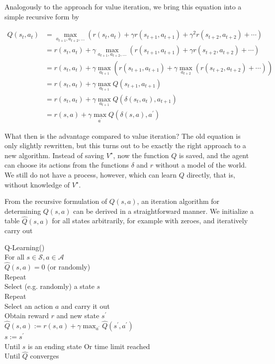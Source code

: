 \documentclass[10pt]{book}
\begin{document}
Analogously to the approach for value iteration, we bring this equation into a simple recursive form by


\begin{align*}
Q\left(s_{t}, a_{t}\right) & =\max _{a_{t+1}, a_{t+2}, \ldots}\left(r\left(s_{t}, a_{t}\right)+\gamma r\left(s_{t+1}, a_{t+1}\right)+\gamma^{2} r\left(s_{t+2}, a_{t+2}\right)+\cdots\right) \\
& =r\left(s_{t}, a_{t}\right)+\gamma \max _{a_{t+1}, a_{t+2}, \ldots}\left(r\left(s_{t+1}, a_{t+1}\right)+\gamma r\left(s_{t+2}, a_{t+2}\right)+\cdots\right) \\
& =r\left(s_{t}, a_{t}\right)+\gamma \max _{a_{t+1}}\left(r\left(s_{t+1}, a_{t+1}\right)+\gamma \max _{a_{t+2}}\left(r\left(s_{t+2}, a_{t+2}\right)+\cdots\right)\right) \\
& =r\left(s_{t}, a_{t}\right)+\gamma \max _{a_{t+1}} Q\left(s_{t+1}, a_{t+1}\right) \\
& =r\left(s_{t}, a_{t}\right)+\gamma \max _{a_{t+1}} Q\left(\delta\left(s_{t}, a_{t}\right), a_{t+1}\right) \\
& =r(s, a)+\gamma \max _{a^{\prime}} Q\left(\delta(s, a), a^{\prime}\right) \tag{10.11}
\end{align*}


What then is the advantage compared to value iteration? The old equation is only slightly rewritten, but this turns out to be exactly the right approach to a new algorithm. Instead of saving $V^{\star}$, now the function $Q$ is saved, and the agent can choose its actions from the functions $\delta$ and $r$ without a model of the world. We still do not have a process, however, which can learn $Q$ directly, that is, without knowledge of $V^{\star}$.

From the recursive formulation of $Q(s, a)$, an iteration algorithm for determining $Q(s, a)$ can be derived in a straightforward manner. We initialize a table $\hat{Q}(s, a)$ for all states arbitrarily, for example with zeroes, and iteratively carry out

Q-Learning()\\
For all $s \in \mathcal{S}, a \in \mathcal{A}$\\

$\hat{Q}(s, a)=0$ (or randomly)\\
Repeat\\
Select (e.g. randomly) a state $s$\\
Repeat\\
Select an action $a$ and carry it out\\
Obtain reward $r$ and new state $s^{\prime}$\\
$\hat{Q}(s, a):=r(s, a)+\gamma \max _{a^{\prime}} \hat{Q}\left(s^{\prime}, a^{\prime}\right)$\\
$s:=s^{\prime}$\\
Until $s$ is an ending state Or time limit reached\\
Until $\hat{Q}$ converges
\end{document}
